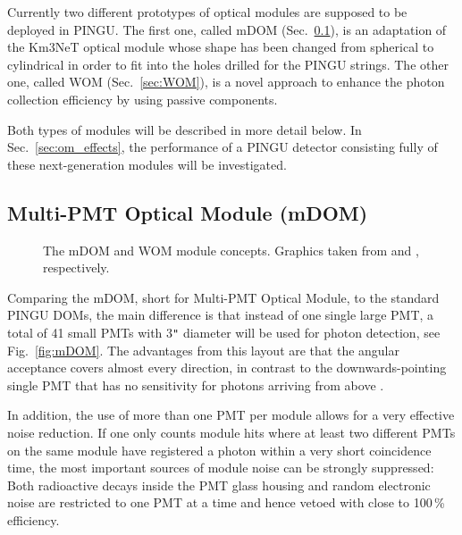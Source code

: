 Currently two different prototypes of optical modules are supposed to be
deployed in PINGU. The first one, called mDOM (Sec.~\ref{sec:mDOM}), is an
adaptation of the Km3NeT optical module \cite{Km3NeTmodule} whose shape has been
changed from spherical to cylindrical in order to fit into the holes drilled for
the PINGU strings. The other one, called WOM (Sec.~\ref{sec:WOM}), is a novel
approach to enhance the photon collection efficiency by using passive
components.

Both types of modules will be described in more detail below. In
Sec.~\ref{sec:om_effects}, the performance of a PINGU detector consisting fully
of these next-generation modules will be investigated.

\subsection{Multi-PMT Optical Module (mDOM)}
\label{sec:mDOM}


\begin{figure}
\centering
  \qquad
  \caption{The \protect{} mDOM and \protect{} WOM
    module concepts. Graphics taken from \cite{mDOM_Geneva} and \cite{WOM_ICRC},
    respectively.}
\label{fig:Gen3modules}
\end{figure}

Comparing the mDOM, short for Multi-PMT Optical Module, to the standard PINGU
DOMs, the main difference is that instead of one single large PMT, a total of
41 small PMTs with 3\verb+"+ diameter will be used for photon detection, see
Fig.~\ref{fig:mDOM}. The advantages from this layout are that the angular
acceptance covers almost every direction, in contrast to the downwards-pointing
single PMT that has no sensitivity for photons arriving from above
\cite{mDOM_Geneva}.

In addition, the use of more than one PMT per module allows for a very
effective noise reduction. If one only counts module hits where at least two
different PMTs on the same module have registered a photon within a very short
coincidence time, the most important sources of module noise can be strongly
suppressed: Both radioactive decays inside the PMT glass housing and random
electronic noise are restricted to one PMT at a time and hence vetoed with
close to 100\,\% efficiency.


